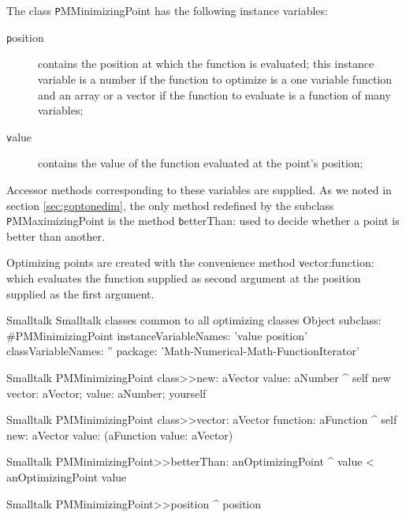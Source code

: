 \noindent The class {\texttt PMMinimizingPoint} has the following
instance variables:
\begin{description}
  \item[\texttt position] contains the position at which the function
  is evaluated; this instance variable is a number if the function
  to optimize is a one variable function and an array or a vector
  if the function to evaluate is a function of many variables;
  \item[\texttt value] contains the value of the function evaluated at the point's position;
\end{description}
Accessor methods corresponding to these variables are supplied. As
we noted in section \ref{sec:goptonedim}, the only method
redefined by the subclass {\texttt PMMaximizingPoint} is the method
{\texttt betterThan:} used to decide whether a point is better than
another.

Optimizing points are created with the convenience method {\texttt
vector:function:} which evaluates the function supplied as second
argument at the position supplied as the first argument.

\begin{listing}[label=ls:optimizerCommon]{Smalltalk}
{Smalltalk classes common to all optimizing classes}
Object subclass: #PMMinimizingPoint
   instanceVariableNames: 'value position'
   classVariableNames: ''
   package: 'Math-Numerical-Math-FunctionIterator'
\end{listing}

\begin{displaycode}{Smalltalk}
PMMinimizingPoint class>>new: aVector value: aNumber
   ^ self new vector: aVector; value: aNumber; yourself  
\end{displaycode}  

\begin{displaycode}{Smalltalk}
PMMinimizingPoint class>>vector: aVector function: aFunction
   ^ self new: aVector value: (aFunction value: aVector)
\end{displaycode}

\begin{displaycode}{Smalltalk}
PMMinimizingPoint>>betterThan: anOptimizingPoint
   ^ value < anOptimizingPoint value
\end{displaycode}

\begin{displaycode}{Smalltalk}
PMMinimizingPoint>>position
   ^ position
\end{displaycode}

